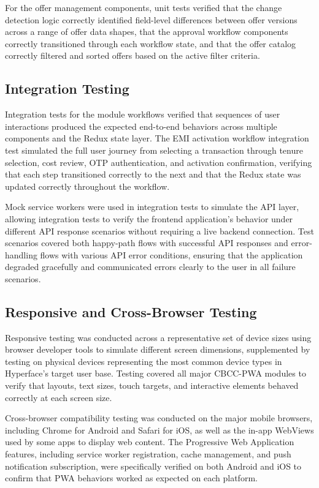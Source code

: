 For the offer management components, unit tests verified that the change detection logic correctly identified field-level differences between offer versions across a range of offer data shapes, that the approval workflow components correctly transitioned through each workflow state, and that the offer catalog correctly filtered and sorted offers based on the active filter criteria.

\subsection{Integration Testing}

Integration tests for the module workflows verified that sequences of user interactions produced the expected end-to-end behaviors across multiple components and the Redux state layer. The EMI activation workflow integration test simulated the full user journey from selecting a transaction through tenure selection, cost review, OTP authentication, and activation confirmation, verifying that each step transitioned correctly to the next and that the Redux state was updated correctly throughout the workflow.

Mock service workers were used in integration tests to simulate the API layer, allowing integration tests to verify the frontend application's behavior under different API response scenarios without requiring a live backend connection. Test scenarios covered both happy-path flows with successful API responses and error-handling flows with various API error conditions, ensuring that the application degraded gracefully and communicated errors clearly to the user in all failure scenarios.

\subsection{Responsive and Cross-Browser Testing}

Responsive testing was conducted across a representative set of device sizes using browser developer tools to simulate different screen dimensions, supplemented by testing on physical devices representing the most common device types in Hyperface's target user base. Testing covered all major CBCC-PWA modules to verify that layouts, text sizes, touch targets, and interactive elements behaved correctly at each screen size.

Cross-browser compatibility testing was conducted on the major mobile browsers, including Chrome for Android and Safari for iOS, as well as the in-app WebViews used by some apps to display web content. The Progressive Web Application features, including service worker registration, cache management, and push notification subscription, were specifically verified on both Android and iOS to confirm that PWA behaviors worked as expected on each platform.

